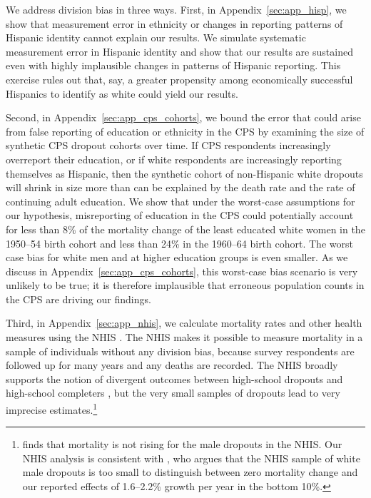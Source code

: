 \documentclass[12pt,letterpaper]{article}
\numberwithin{equation}{section}
\begin{document}
We address division bias in three ways. First, in Appendix~\ref{sec:app_hisp}, we show that measurement error in ethnicity or changes in reporting patterns of Hispanic identity cannot explain our results. We simulate systematic measurement error in Hispanic identity and show that our results are sustained even with highly implausible changes in patterns of Hispanic reporting. This exercise rules out that, say, a greater propensity among economically successful Hispanics to identify as white could yield our results.

Second, in Appendix~\ref{sec:app_cps_cohorts}, we bound the error that could arise from false reporting of education or ethnicity in the CPS by examining the size of synthetic CPS dropout cohorts over time. If CPS respondents increasingly overreport their education, or if white respondents are increasingly reporting themselves as Hispanic, then the synthetic cohort of non-Hispanic white dropouts will shrink in size more than can be explained by the death rate and the rate of continuing adult education. We show that under the worst-case assumptions for our hypothesis, misreporting of education in the CPS could potentially account for less than 8\% of the mortality change of the least educated white women in the 1950--54 birth cohort and less than 24\% in the 1960--64 birth cohort. The worst case bias for white men and at higher education groups is even smaller. As we discuss in Appendix~\ref{sec:app_cps_cohorts}, this worst-case bias scenario is very unlikely to be true; it is therefore implausible that erroneous population counts in the CPS are driving our findings.

Third, in Appendix~\ref{sec:app_nhis}, we calculate mortality rates and other health measures using the NHIS \citep{nhis}. The NHIS makes it possible to measure mortality in a sample of individuals without any division bias, because survey respondents are followed up for many years and any deaths are recorded. The NHIS broadly supports the notion of divergent outcomes between high-school dropouts and high-school completers \citep{Hendi2015,Sasson2016,Hendi2017,Sasson2017}, but the very small samples of dropouts lead to very imprecise estimates.\footnote{\citet{Hendi2015} finds that mortality is not rising for the male dropouts in the NHIS. Our NHIS analysis is consistent with \citet{Sasson2017}, who argues that the NHIS sample of white male dropouts is too small to distinguish between zero mortality change and our reported effects of 1.6--2.2\% growth per year in the bottom 10\%.}
\end{document}
